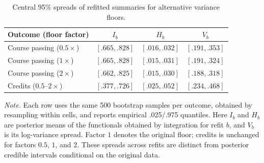 \begin{table}[!t]
\caption{Central 95\% spreads of refitted summaries for alternative variance floors.}
\label{tab:G-ocrs-bootstrap}
\centering
\begin{tablebody}
\begin{tabular}{@{}lccc@{}}
\toprule
Outcome (floor factor) & $I_b$ & $H_b$ & $V_b$ \\
\midrule
Course passing ($0.5\times$) & $[.665,.828]$ & $[.016,.032]$ & $[.191,.353]$ \\
\addlinespace[5pt]
Course passing ($1\times$) & $[.665,.828]$ & $[.015,.031]$ & $[.191,.324]$ \\
\addlinespace[5pt]
Course passing ($2\times$) & $[.662,.825]$ & $[.015,.030]$ & $[.188,.318]$ \\
\addlinespace[9pt]
Credits ($0.5$--$2\times$) & $[.377,.726]$ & $[.025,.052]$ & $[.234,.468]$ \\
\bottomrule
\end{tabular}
\end{tablebody}
\par\vspace{0.4\baselineskip}
\begin{minipage}{\linewidth}\normalsize\doublespacing\raggedright
\textit{Note.} Each row uses the same 500 bootstrap samples per outcome, obtained by resampling within cells, and reports empirical .025/.975 quantiles. Here $I_b$ and $H_b$ are posterior means of the functionals obtained by integration for refit $b$, and $V_b$ is its log-variance spread. Factor $1$ denotes the original floor; credits is unchanged for factors $0.5$, $1$, and $2$. These spreads across refits are distinct from posterior credible intervals conditional on the original data.
\end{minipage}
\end{table}
